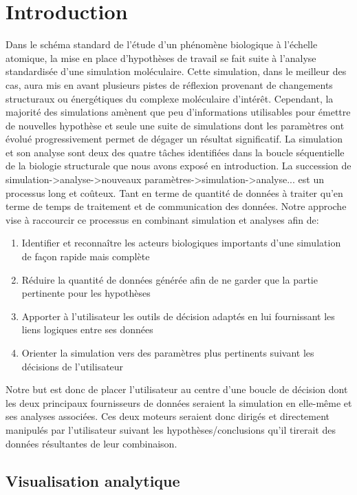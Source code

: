 \section{Introduction}

Dans le schéma standard de l'étude d'un phénomène biologique à l'échelle atomique, la mise en place d'hypothèses de travail se fait suite à l'analyse standardisée d'une simulation moléculaire. Cette simulation, dans le meilleur des cas, aura mis en avant plusieurs pistes de réflexion provenant de changements structuraux ou énergétiques du complexe moléculaire d'intérêt. Cependant, la majorité des simulations amènent que peu d'informations utilisables pour émettre de nouvelles hypothèse et seule une suite de simulations dont les paramètres ont évolué progressivement permet de dégager un résultat significatif. La simulation et son analyse sont deux des quatre tâches identifiées dans la boucle séquentielle de la biologie structurale que nous avons exposé en introduction. La succession de simulation->analyse->nouveaux paramètres->simulation->analyse... est un processus long et coûteux. Tant en terme de quantité de données à traiter qu'en terme de temps de traitement et de communication des données. Notre approche vise à raccourcir ce processus en combinant simulation et analyses afin de:
\begin{enumerate}
    \item Identifier et reconnaître les acteurs biologiques importants d'une simulation de façon rapide mais complète
    \item Réduire la quantité de données générée afin de ne garder que la partie pertinente pour les hypothèses
    \item Apporter à l'utilisateur les outils de décision adaptés en lui fournissant les liens logiques entre ses données
    \item Orienter la simulation vers des paramètres plus pertinents suivant les décisions de l'utilisateur
\end{enumerate}

Notre but est donc de placer l'utilisateur au centre d'une boucle de décision dont les deux principaux fournisseurs de données seraient la simulation en elle-même et ses analyses associées. Ces deux moteurs seraient donc dirigés et directement manipulés par l'utilisateur suivant les hypothèses/conclusions qu'il tirerait des données résultantes de leur combinaison.

\subsection{Visualisation analytique}

